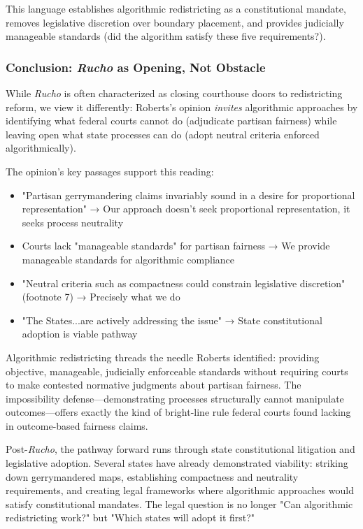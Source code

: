 This language establishes algorithmic redistricting as a constitutional mandate, removes legislative discretion over boundary placement, and provides judicially manageable standards (did the algorithm satisfy these five requirements?).

\subsubsection{Conclusion: \textit{Rucho} as Opening, Not Obstacle}

While \textit{Rucho} is often characterized as closing courthouse doors to redistricting reform, we view it differently: Roberts's opinion \textit{invites} algorithmic approaches by identifying what federal courts cannot do (adjudicate partisan fairness) while leaving open what state processes can do (adopt neutral criteria enforced algorithmically).

The opinion's key passages support this reading:
\begin{itemize}
\item "Partisan gerrymandering claims invariably sound in a desire for proportional representation" → Our approach doesn't seek proportional representation, it seeks process neutrality
\item Courts lack "manageable standards" for partisan fairness → We provide manageable standards for algorithmic compliance
\item "Neutral criteria such as compactness could constrain legislative discretion" (footnote 7) → Precisely what we do
\item "The States...are actively addressing the issue" → State constitutional adoption is viable pathway
\end{itemize}

Algorithmic redistricting threads the needle Roberts identified: providing objective, manageable, judicially enforceable standards without requiring courts to make contested normative judgments about partisan fairness. The impossibility defense—demonstrating processes structurally cannot manipulate outcomes—offers exactly the kind of bright-line rule federal courts found lacking in outcome-based fairness claims.

Post-\textit{Rucho}, the pathway forward runs through state constitutional litigation and legislative adoption. Several states have already demonstrated viability: striking down gerrymandered maps, establishing compactness and neutrality requirements, and creating legal frameworks where algorithmic approaches would satisfy constitutional mandates. The legal question is no longer "Can algorithmic redistricting work?" but "Which states will adopt it first?"
